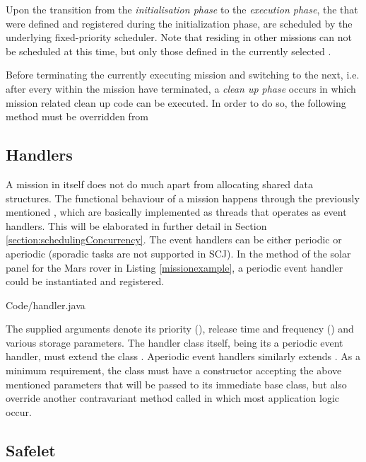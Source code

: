 Upon the transition from the \textit{initialisation phase} to the \textit{execution phase}, the  that were defined and registered during the initialization phase, are scheduled by the underlying fixed-priority scheduler. Note that  residing in other missions can not be scheduled at this time, but only those defined in the currently selected . 

Before terminating the currently executing mission and switching to the next, i.e. after every  within the mission have terminated, a \textit{clean up phase} occurs in which mission related clean up code can be executed. In order to do so, the following method must be overridden from 

\begin{quotation}
\end{quotation}

\subsection{Handlers}
\label{subsection:handlers}
A mission in itself does not do much apart from allocating shared data structures. The functional behaviour of a mission happens through the previously mentioned , which are basically implemented as threads that operates as event handlers. This will be elaborated in further detail in Section \ref{section:schedulingConcurrency}. The event handlers can be either periodic or aperiodic (sporadic tasks are not supported in SCJ). In the  method of the solar panel  for the Mars rover in Listing \ref{missionexample}, a periodic event handler could be instantiated and registered.


{Code/handler.java}

The supplied arguments denote its priority (), release time and frequency () and various storage parameters. The handler class itself, being its a periodic event handler, must extend the class . Aperiodic event handlers similarly extends . As a minimum requirement, the class must have a constructor accepting the above mentioned parameters that will be passed to its immediate base class, but also override another contravariant method called  in which most application logic occur.

\subsection{Safelet}
\label{subsection:safelet}